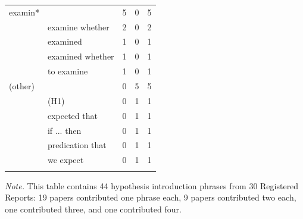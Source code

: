 \documentclass[british,,man,floatsintext]{apa6}
\begin{document}
\begin{table}[tbp]
\begin{center}
\begin{threeparttable}
{\begin{tabular}{llrrr}
examin* &  & 5 & 0 & 5\\
 & examine whether & 2 & 0 & 2\\
 & examined & 1 & 0 & 1\\
 & examined whether & 1 & 0 & 1\\
 & to examine & 1 & 0 & 1\\ \midrule
(other) &  & 0 & 5 & 5\\
 & (H1) & 0 & 1 & 1\\
 & expected that & 0 & 1 & 1\\
 & if ... then & 0 & 1 & 1\\
 & predication that & 0 & 1 & 1\\
 & we expect & 0 & 1 & 1\\
\bottomrule
\addlinespace
\end{tabular}
}
\begin{tablenotes}[para]
\normalsize{\textit{Note.} This table contains 44 hypothesis introduction phrases from 30 Registered Reports: 19 papers contributed one phrase each, 9 papers contributed two each, one contributed three, and one contributed four.}
\end{tablenotes}
\end{threeparttable}
\end{center}
\end{table}
\end{document}
